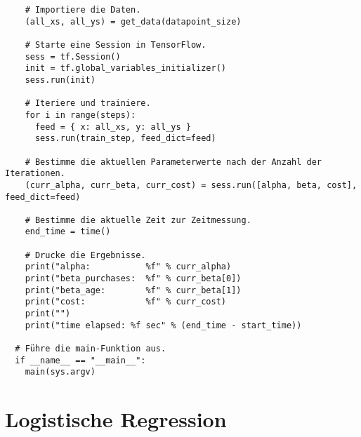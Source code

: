 \begin{verbatim}
    # Importiere die Daten.
    (all_xs, all_ys) = get_data(datapoint_size)

    # Starte eine Session in TensorFlow.
    sess = tf.Session()
    init = tf.global_variables_initializer()
    sess.run(init)

    # Iteriere und trainiere.
    for i in range(steps):
      feed = { x: all_xs, y: all_ys }
      sess.run(train_step, feed_dict=feed)

    # Bestimme die aktuellen Parameterwerte nach der Anzahl der Iterationen.
    (curr_alpha, curr_beta, curr_cost) = sess.run([alpha, beta, cost], feed_dict=feed)

    # Bestimme die aktuelle Zeit zur Zeitmessung.
    end_time = time()

    # Drucke die Ergebnisse.
    print("alpha:           %f" % curr_alpha)
    print("beta_purchases:  %f" % curr_beta[0])
    print("beta_age:        %f" % curr_beta[1])
    print("cost:            %f" % curr_cost)
    print("")
    print("time elapsed: %f sec" % (end_time - start_time))

  # Führe die main-Funktion aus.
  if __name__ == "__main__":
    main(sys.argv)
\end{verbatim}

\section{Logistische Regression}
\label{appendix:C:3}

